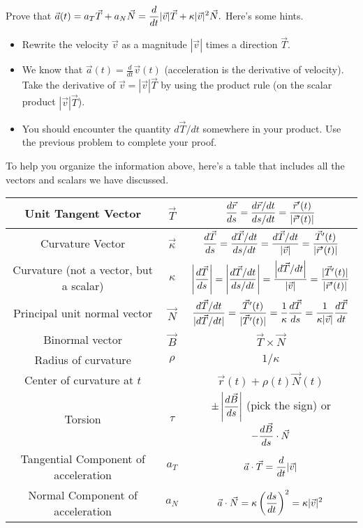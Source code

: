 \begin{problem}%
 Prove that $\displaystyle \vec a(t) = a_T\vec T+a_N\vec N=\frac{d}{dt}|\vec v| \vec T + \kappa |\vec v|^2 \vec N.$ Here's some hints.
\begin{itemize}
 \item Rewrite the velocity $\vec v$ as a magnitude $|\vec v|$ times a direction $\vec T$.  
 \item We know that $\vec a(t) = \frac{d}{dt}\vec v(t)$ (acceleration is the derivative of velocity). Take the derivative of $\vec v = |\vec v|\vec T$ by using the product rule (on the scalar product $|\vec v|\vec T$).
 \item You should encounter the quantity $d\vec T/dt$ somewhere in your product.  Use the previous problem to complete your proof.
\end{itemize}
\end{problem}

To help you organize the information above, here's a table that includes all the vectors and scalars we have discussed.

\begin{center}
\begin{tabular}{|c|c|c|}
\hline
Unit Tangent Vector & $\vec T$ & $\displaystyle\frac{d\vec r}{ds} = \frac{d\vec r/dt}{ds/dt} = \frac{\vec r^\prime(t)}{|\vec r^\prime(t)|}$\\\hline
Curvature Vector & $\vec \kappa $& $\displaystyle\frac{d\vec T}{ds} =\frac{d\vec T/dt}{ds/dt} = \frac{d\vec T/dt}{|\vec v|} = \frac{\vec T^\prime(t)}{|\vec r^\prime(t)|} $\\\hline
Curvature (not a vector, but a scalar)& $ \kappa $&$\displaystyle \left|\frac{d\vec T}{ds}\right| =\left|\frac{d\vec T/dt}{ds/dt}\right| = \frac{\left|d\vec T/dt\right|}{|\vec v|}= \frac{|\vec T^\prime(t)|}{|\vec r^\prime(t)|}  $ \\\hline
Principal unit normal vector & $ \vec N$& $\displaystyle \frac{d\vec T/dt}{|d\vec T/dt|} =  \frac{\vec T^\prime(t)}{|\vec T^\prime(t)|}=\frac{1}{\kappa}\frac{d\vec T}{ds} = \frac{1}{\kappa |\vec v|}\frac{d\vec T}{dt}$\\\hline
Binormal vector & $ \vec B$& $ \vec T\times\vec N$\\\hline
Radius of curvature & $ \rho$ & $1/\kappa$\\\hline
Center of curvature at $t$&  & $\vec r(t)+\rho(t)\vec N(t)$ \\\hline
Torsion & $ \tau $ & $\displaystyle \pm\left|\frac{d\vec B}{ds}\right|$ (pick the sign) or $\displaystyle-\frac{d\vec B}{ds}\cdot \vec N $\\\hline
Tangential Component of acceleration & $ a_T$ & $\displaystyle \vec a \cdot \vec T = \frac{d}{dt}|\vec v|$\\\hline
Normal Component of acceleration & $ a_N$ & $\displaystyle \vec a \cdot \vec N = \kappa \left(\frac{ds}{dt}\right)^2 = \kappa |\vec v|^2$\\\hline
\end{tabular}
\end{center}

